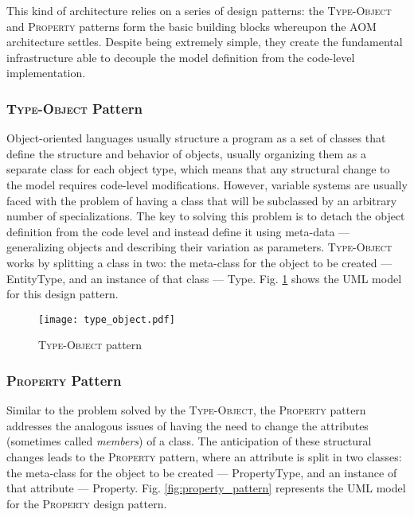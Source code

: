 This kind of architecture relies on a series of design patterns: the \textsc{Type-Object} and \textsc{Property} patterns form the basic building blocks whereupon the AOM architecture settles. Despite being extremely simple, they create the fundamental infrastructure able to decouple the model definition from the code-level implementation.

\subsubsection{\textsc{Type-Object} Pattern}\label{sec:type-entity_pattern}

Object-oriented languages usually structure a program as a set of classes that define the structure and behavior of objects, usually organizing them as a separate class for each object type, which means that any structural change to the model requires code-level modifications. However, variable systems are usually faced with the problem of having a class that will be subclassed by an arbitrary number of specializations. The key to solving this problem is to detach the object definition from the code level and instead define it using meta-data --- generalizing objects and describing their variation as parameters. \textsc{Type-Object} works by splitting a class in two: the meta-class for the object to be created --- EntityType, and an instance of that class --- Type. Fig. \ref{fig:type-object_pattern} shows the UML model for this design pattern.

\begin{figure}[H]
  \centering
  \texttt{[image: type\_object.pdf]}
  \caption{\textsc{Type-Object} pattern}
  \label{fig:type-object_pattern}
\end{figure}

\subsubsection{\textsc{Property} Pattern}\label{sec:property_pattern}

Similar to the problem solved by the \textsc{Type-Object}, the \textsc{Property} pattern addresses the analogous issues of having the need to change the attributes (sometimes called \emph{members}) of a class. The anticipation of these structural changes leads to the \textsc{Property} pattern, where an attribute is split in two classes: the meta-class for the object to be created --- PropertyType, and an instance of that attribute --- Property. Fig. \ref{fig:property_pattern} represents the UML model for the \textsc{Property} design pattern.

